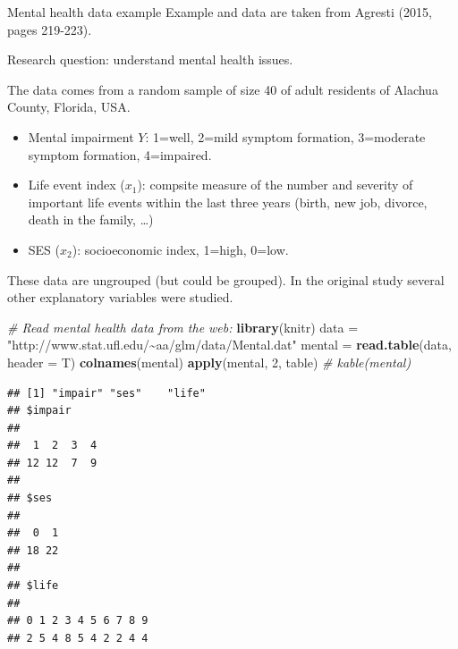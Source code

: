 \documentclass[
  ignorenonframetext,
]{beamer}
\newenvironment{Shaded}{\begin{snugshade}}{\end{snugshade}}
\newcommand{\AttributeTok}[1]{\textcolor[rgb]{0.13,0.29,0.53}{#1}}
\newcommand{\CommentTok}[1]{\textcolor[rgb]{0.56,0.35,0.01}{\textit{#1}}}
\newcommand{\DecValTok}[1]{\textcolor[rgb]{0.00,0.00,0.81}{#1}}
\newcommand{\FunctionTok}[1]{\textcolor[rgb]{0.13,0.29,0.53}{\textbf{#1}}}
\newcommand{\NormalTok}[1]{#1}
\newcommand{\OtherTok}[1]{\textcolor[rgb]{0.56,0.35,0.01}{#1}}
\newcommand{\StringTok}[1]{\textcolor[rgb]{0.31,0.60,0.02}{#1}}
\providecommand{\tightlist}{%
  \setlength{\itemsep}{0pt}\setlength{\parskip}{0pt}}
\begin{document}
\begin{frame}
\begin{block}{Mental health data example}
\protect\hypertarget{mental-health-data-example}{}
Example and data are taken from Agresti (2015, pages 219-223).

Research question: understand mental health issues.

The data comes from a random sample of size 40 of adult residents of
Alachua County, Florida, USA.

\begin{itemize}
\tightlist
\item
  Mental impairment \(Y\): 1=well, 2=mild symptom formation, 3=moderate
  symptom formation, 4=impaired.
\item
  Life event index (\(x_1\)): compsite measure of the number and
  severity of important life events within the last three years (birth,
  new job, divorce, death in the family, \ldots)
\item
  SES (\(x_2\)): socioeconomic index, 1=high, 0=low.
\end{itemize}

These data are ungrouped (but could be grouped). In the original study
several other explanatory variables were studied.
\end{block}
\end{frame}

\begin{frame}[fragile]
\begin{Shaded}
\begin{Highlighting}[]
\CommentTok{\# Read mental health data from the web:}
\FunctionTok{library}\NormalTok{(knitr)}
\NormalTok{data }\OtherTok{=} \StringTok{"http://www.stat.ufl.edu/\textasciitilde{}aa/glm/data/Mental.dat"}
\NormalTok{mental }\OtherTok{=} \FunctionTok{read.table}\NormalTok{(data, }\AttributeTok{header =}\NormalTok{ T)}
\FunctionTok{colnames}\NormalTok{(mental)}
\FunctionTok{apply}\NormalTok{(mental, }\DecValTok{2}\NormalTok{, table)}
\CommentTok{\# kable(mental)}
\end{Highlighting}
\end{Shaded}

\begin{verbatim}
## [1] "impair" "ses"    "life"  
## $impair
## 
##  1  2  3  4 
## 12 12  7  9 
## 
## $ses
## 
##  0  1 
## 18 22 
## 
## $life
## 
## 0 1 2 3 4 5 6 7 8 9 
## 2 5 4 8 5 4 2 2 4 4
\end{verbatim}
\end{frame}
\end{document}
